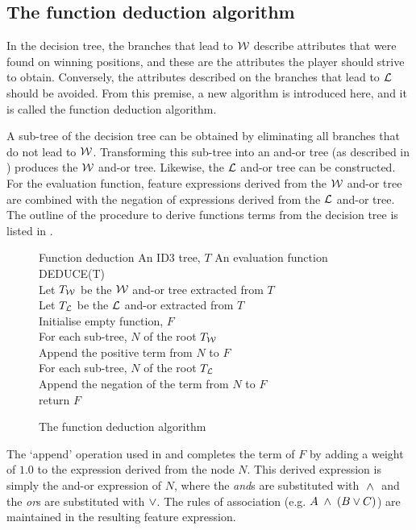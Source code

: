 \subsection{The function deduction algorithm}
\label{sec:deduce_function}
In the decision tree, the branches that lead to ${\mathcal W}$ describe attributes that were found on winning positions, and these are the attributes the player should strive to obtain.  Conversely, the attributes described on the branches that lead to ${\mathcal L}$ should be avoided.  From this premise, a new  algorithm is introduced here, and it is called the function deduction algorithm.  

A sub-tree of the decision tree can be obtained by eliminating all branches that do not lead to ${\mathcal W}$. Transforming this sub-tree into an and-or tree (as described in ) produces the ${\mathcal W}$ and-or tree.  Likewise, the ${\mathcal L}$ and-or tree can be constructed.  For the evaluation function, feature expressions derived from the ${\mathcal W}$ and-or tree are combined with the negation of expressions derived from the ${\mathcal L}$ and-or tree.  The outline of the procedure to derive functions terms from the decision tree is listed in .    

\begin{figure}[t] 
\begin{algorithm}
{Function deduction}
{An ID3 tree, $T$}
{An evaluation function}
DEDUCE(T) \+ \\
	Let $T_{{\mathcal W}}$ be the ${\mathcal W}$ and-or tree extracted from $T$  \label{line:get_win_tree} \\
	Let $T_{{\mathcal L}}$ be the ${\mathcal L}$ and-or extracted from $T$ \label{line:get_lose_tree} \\
	Initialise empty function, $F$  \\
	For each sub-tree, $N$ of the root  $T_{{\mathcal W}}$ \+ \\ 
		Append the positive term from $N$ to $F$ \label{line:deduce_pos} \- \\ 
	For each sub-tree, $N$ of the root  $T_{{\mathcal L}}$ \+ \\ 
		Append the negation of the term from $N$ to $F$ \label{line:deduce_neg} \- \\ 
	return $F$		
\end{algorithm}
\caption{The function deduction algorithm}
\label{alg:deduction}
\end{figure}
The `append' operation used in  and  completes the term of $F$ by adding a weight of $1.0$ to the expression derived from the node $N$.  This derived expression is simply the and-or expression of $N$, where the {\sl and}s are substituted with $\;\wedge\;$ and the {\sl or}s are substituted with $\vee$.  The rules of association (e.g. $A \;\wedge\; (B \vee C)$) are maintained in the resulting feature expression.

